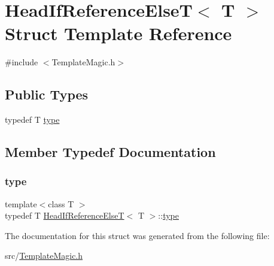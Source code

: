 \hypertarget{struct_head_if_reference_else_t_3_01_t_01_4}{}\section{Head\+If\+Reference\+ElseT$<$ T $>$ Struct Template Reference}
\label{struct_head_if_reference_else_t_3_01_t_01_4}


{\ttfamily \#include $<$Template\+Magic.\+h$>$}

\subsection*{Public Types}
\begin{DoxyCompactItemize}
\item 
typedef T \hyperlink{struct_head_if_reference_else_t_3_01_t_01_4_ad4fabe2100fa4371e776a7ad1f75a46e}{type}
\end{DoxyCompactItemize}


\subsection{Member Typedef Documentation}
\mbox{\label{struct_head_if_reference_else_t_3_01_t_01_4_ad4fabe2100fa4371e776a7ad1f75a46e}} 
\subsubsection{\texorpdfstring{type}{type}}
{\footnotesize\ttfamily template$<$class T $>$ \\
typedef T \hyperlink{struct_head_if_reference_else_t}{Head\+If\+Reference\+ElseT}$<$ T $>$\+::\hyperlink{struct_head_if_reference_else_t_3_01_t_01_4_ad4fabe2100fa4371e776a7ad1f75a46e}{type}}



The documentation for this struct was generated from the following file\+:\begin{DoxyCompactItemize}
\item 
src/\hyperlink{_template_magic_8h}{Template\+Magic.\+h}\end{DoxyCompactItemize}
